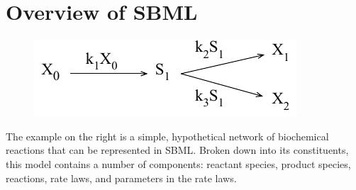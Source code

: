 \documentclass[10pt]{cekarticle}
\newcommand{\changed}[1]{\textcolor{BrickRed}{#1}}
\begin{document}
\section{Overview of SBML}
\label{sec:overview}

\begin{figure}
\begin{center}
\vspace*{-2ex}
\includegraphics[scale = 0.85]{figs/example-network}
\end{center}
\end{figure}
\changed{The example on the right is a simple, hypothetical network of
  biochemical reactions that can be represented in SBML.}  Broken down into
its constituents, this model contains a number of components: reactant
species, product species, reactions, rate laws, and parameters in the rate
laws.
\end{document}
